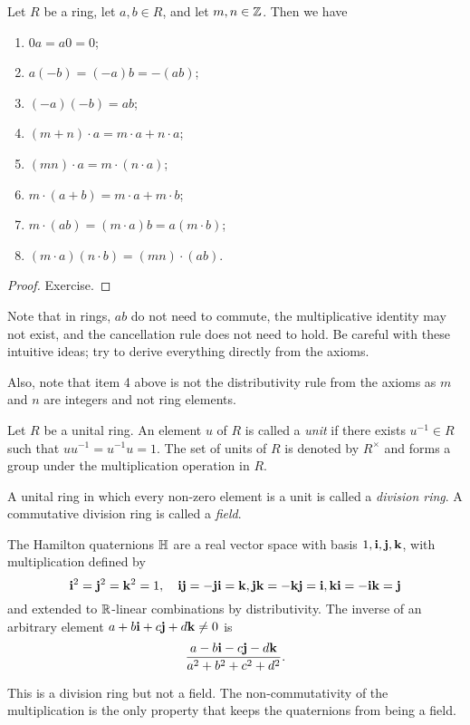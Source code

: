 \begin{theorem}
  Let $R$ be a ring, let $a,b\in R$, and let $m,n\in\mathbb Z$. Then we have 
  \begin{enumerate}
    \item $0a = a0 =0$;
    \item $a(-b)=(-a)b=-(ab)$;
    \item $(-a)(-b)=ab$;
    \item $(m+n)\cdot a = m\cdot a+n\cdot a$; 
    \item $(mn)\cdot a=m\cdot(n\cdot a)$;
    \item $m\cdot(a+b)=m\cdot a+m\cdot b$;
    \item $m\cdot(ab)=(m\cdot a)b = a(m\cdot b)$;
    \item $(m\cdot a)(n\cdot b)=(mn)\cdot(ab)$.
  \end{enumerate}
  \label{<+label+>}
\end{theorem}
\begin{proof}
    Exercise.
\end{proof}

\begin{remark}
  Note that in rings, $ab$ do not need to commute, the multiplicative identity may not exist, and the cancellation rule does not need to hold. Be careful with these intuitive ideas; try to derive everything directly from the axioms.
  
  Also, note that item 4 above is not the distributivity rule from the axioms as $m$ and $n$ are integers and not ring elements.
\end{remark}

\begin{definition}
  Let $R$ be a unital ring. An element $u$ of $R$ is called a \emph{unit} if there exists
  $u^{-1}\in R$ such that $uu^{-1}=u^{-1}u=1$. The set of units of $R$ is denoted by $R^{\times}$ and forms a group under the multiplication operation in $R$.
 
  \label{<+label+>}
\end{definition}

\begin{definition}
  A unital ring in which every non-zero element is a unit is called a \emph{division
  ring}. A commutative division ring is called a \emph{field}.
  \label{<+label+>}
\end{definition}

\begin{example}
  The Hamilton quaternions $\mathbb H$ are a real vector space with basis $1, \mathbf i, \mathbf j, \mathbf k$, with
  multiplication defined by 
  \[\mathbf i^2=\mathbf j^2=\mathbf k^2=1, \quad \mathbf i\mathbf j=-\mathbf j\mathbf i=\mathbf k, \mathbf j\mathbf k=-\mathbf k\mathbf j=\mathbf i, \mathbf k\mathbf i=-\mathbf i\mathbf k=\mathbf j\]
  and extended to $\mathbb R$-linear combinations by distributivity. The inverse of an arbitrary element
  $a+b\mathbf i+c\mathbf j+d\mathbf k \neq 0$ is $$\frac{a-b\mathbf i-c\mathbf j-d\mathbf k}{a^2+b^2+c^2+d^2}.$$

  This is a division ring but not a field. The non-commutativity of the multiplication is the only property that keeps the quaternions from being a field.
\end{example}

